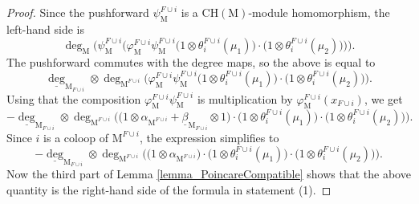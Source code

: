 \documentclass[11pt,reqno]{amsart}
\theoremstyle{definition}
\theoremstyle{remark}
\renewcommand{\(}{\left(}
\renewcommand{\)}{\right)}
\newcommand{\<}{\left<}
\renewcommand{\>}{\right>}
\begin{document}
\begin{proof}
Since the pushforward $\psi^{F\cup i}_{\mathrm{M}}$ is  a $\mathrm{CH}(\mathrm{M})$-module homomorphism, 
the left-hand side is
\[
\deg_{\mathrm{M}} \big(\psi^{F\cup i}_{\mathrm{M}}\big(\varphi^{F\cup i}_{\mathrm{M}}\psi^{F\cup i}_{\mathrm{M}}\big( 1\otimes \theta_i^{F \cup i}(\mu_1)\big)\cdot \big(1\otimes \theta_i^{F \cup i}(\mu_2)\big) \big)\big).
\]
The pushforward commutes with the degree maps, so the above is equal to
\[
\underline\deg_{\mathrm{M}_{F\cup i}}\otimes \deg_{\mathrm{M}^{F\cup i}} \big(\varphi^{F\cup i}_{\mathrm{M}}\psi^{F\cup i}_{\mathrm{M}}\big( 1\otimes \theta_i^{F \cup i}(\mu_1)\big)\cdot \big( 1 \otimes \theta_i^{F \cup i}(\mu_2)\big)\big).
\]
Using that the composition $\varphi^{F\cup i}_{\mathrm{M}}\psi^{F\cup i}_{\mathrm{M}}$ is multiplication by $\varphi^{F\cup i}_{\mathrm{M}}(x_{F \cup i})$, we get
\[
-\underline\deg_{\mathrm{M}_{F\cup i}}\otimes \deg_{\mathrm{M}^{F\cup i}} \big( \big(1 \otimes \alpha_{\mathrm{M}^{F \cup i}} + \underline{\beta}_{\mathrm{M}_{F \cup i}} \otimes 1\big) \cdot \big( 1\otimes \theta_i^{F \cup i}(\mu_1)\big)\cdot \big( 1 \otimes \theta_i^{F \cup i}(\mu_2)\big)\big).
\]
Since $i$ is a coloop of $\mathrm{M}^{F \cup i}$, the expression simplifies to
\[
-\underline\deg_{\mathrm{M}_{F\cup i}}\otimes \deg_{\mathrm{M}^{F\cup i}} \big( \big(1 \otimes \alpha_{\mathrm{M}^{F \cup i}} \big) \cdot \big(1\otimes \theta_i^{F \cup i}(\mu_1)\big)\cdot \big( 1 \otimes \theta_i^{F \cup i}(\mu_2)\big)\big).
\]
Now the third part of Lemma \ref{lemma_PoincareCompatible} shows that the above quantity is 
the right-hand side of the formula in statement (1).

\end{proof}
\end{document}
